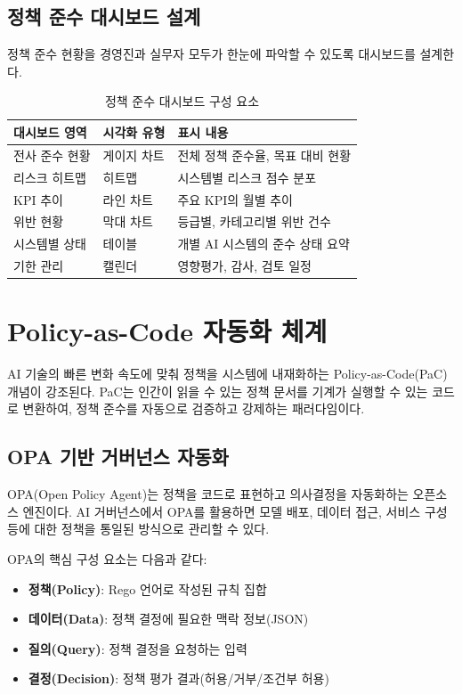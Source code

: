 \subsection{정책 준수 대시보드 설계}
\label{sec:5.4.4}

정책 준수 현황을 경영진과 실무자 모두가 한눈에 파악할 수 있도록 대시보드를 설계한다.

\begin{table}[htbp]
\centering
\caption{정책 준수 대시보드 구성 요소}
\label{tab:dashboard_components}
\begin{tabularx}{\textwidth}{p{3cm}p{2.5cm}X}
\toprule
\textbf{대시보드 영역} & \textbf{시각화 유형} & \textbf{표시 내용} \\
\midrule
전사 준수 현황 & 게이지 차트 & 전체 정책 준수율, 목표 대비 현황 \\
리스크 히트맵 & 히트맵 & 시스템별 리스크 점수 분포 \\
KPI 추이 & 라인 차트 & 주요 KPI의 월별 추이 \\
위반 현황 & 막대 차트 & 등급별, 카테고리별 위반 건수 \\
시스템별 상태 & 테이블 & 개별 AI 시스템의 준수 상태 요약 \\
기한 관리 & 캘린더 & 영향평가, 감사, 검토 일정 \\
\bottomrule
\end{tabularx}
\end{table}

\section{Policy-as-Code 자동화 체계}
\label{sec:5.5}

AI 기술의 빠른 변화 속도에 맞춰 정책을 시스템에 내재화하는 Policy-as-Code(PaC) 개념이 강조된다. PaC는 인간이 읽을 수 있는 정책 문서를 기계가 실행할 수 있는 코드로 변환하여, 정책 준수를 자동으로 검증하고 강제하는 패러다임이다.

\subsection{OPA 기반 거버넌스 자동화}
\label{sec:5.5.1}

OPA(Open Policy Agent)는 정책을 코드로 표현하고 의사결정을 자동화하는 오픈소스 엔진이다. AI 거버넌스에서 OPA를 활용하면 모델 배포, 데이터 접근, 서비스 구성 등에 대한 정책을 통일된 방식으로 관리할 수 있다.

OPA의 핵심 구성 요소는 다음과 같다:
\begin{itemize}
 \item \textbf{정책(Policy)}: Rego 언어로 작성된 규칙 집합
 \item \textbf{데이터(Data)}: 정책 결정에 필요한 맥락 정보(JSON)
 \item \textbf{질의(Query)}: 정책 결정을 요청하는 입력
 \item \textbf{결정(Decision)}: 정책 평가 결과(허용/거부/조건부 허용)
\end{itemize}

